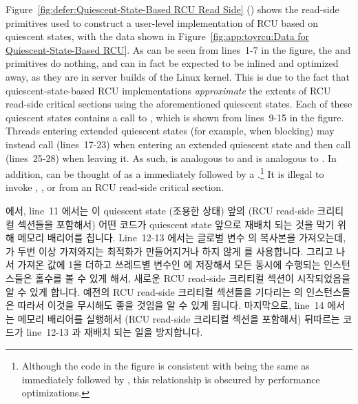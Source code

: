 Figure~\ref{fig:defer:Quiescent-State-Based RCU Read Side}
()
shows the read-side primitives used to construct a user-level
implementation of RCU based on quiescent states, with the data shown in
Figure~\ref{fig:app:toyrcu:Data for Quiescent-State-Based RCU}.
As can be seen from lines~1-7 in the figure, the 
and  primitives do nothing, and can in fact
be expected to be inlined and optimized away, as they are in
server builds of the Linux kernel.
This is due to the fact that quiescent-state-based RCU implementations
\emph{approximate} the extents of RCU read-side critical sections
using the aforementioned quiescent states.
Each of these quiescent states contains a call to
, which is shown from lines~9-15 in the figure.
Threads entering extended quiescent states (for example, when blocking)
may instead call  (lines~17-23) when entering
an extended quiescent state and then call
 (lines~25-28) when leaving it.
As such,  is analogous to 
and  is analogous to .
In addition,  can be thought of as a
 immediately followed by a
.\footnote{
	Although the code in the figure is consistent with
	being the same as  immediately followed by
	, this relationship is obscured by
	performance optimizations.}
It is illegal to invoke , ,
or  from an RCU read-side critical section.
\fi

 에서, line~11 에서는 이 quiescent state (조용한
상태) 앞의 (RCU read-side 크리티컬 섹션들을 포함해서) 어떤 코드가 quiescent
state 앞으로 재배치 되는 것을 막기 위해 메모리 배리어를 칩니다.
Line~12-13 에서는 글로벌 변수  의 복사본을 가져오는데,
 가 두번 이상 가져와지는 최적화가 만들어지거나 하지 않게
 를 사용합니다. 그리고 나서 가져온 값에 1을 더하고 쓰레드별
변수인  에 저장해서 모든 동시에 수행되는
 인스턴스들은 홀수를 볼 수 있게 해서, 새로운 RCU read-side
크리티컬 섹션이 시작되었음을 알 수 있게 합니다.
예전의 RCU read-side 크리티컬 섹션들을 기다리는  의
인스턴스들은 따라서 이것을 무시해도 좋을 것임을 알 수 있게 됩니다.
마지막으로, line~14 에서는 메모리 배리어를 실행해서 (RCU read-side 크리티컬
섹션을 포함해서) 뒤따르는 코드가 line~12-13 과 재배치 되는 일을 방지합니다.
\iffalse

